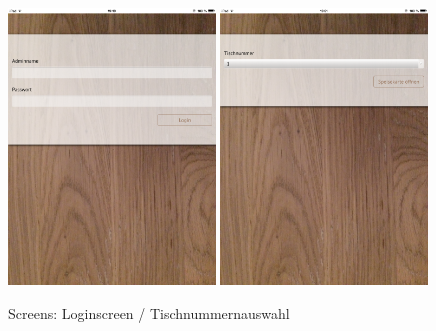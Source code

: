 			\begin{figure}[H]
			\begin{centering}
			\includegraphics[width = 0.49\textwidth]{Bilder/Jok_login}
			\includegraphics[width = 0.49\textwidth]{Bilder/Jok_tnr}
			\par\end{centering}
			\caption{Screens: Loginscreen / Tischnummernauswahl}
			\label{Screens: Loginscreen / Tischnummernauswahl}
			\end{figure}

